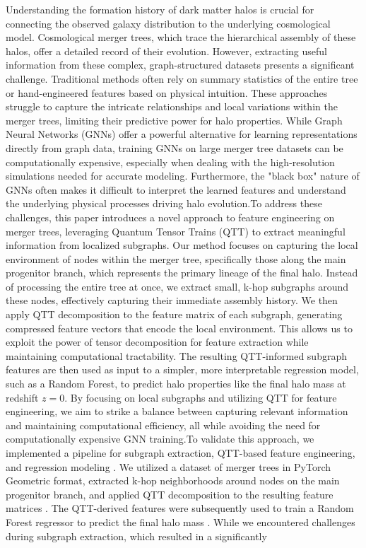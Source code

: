 \documentclass[twocolumn]{aastex631}
\begin{document}
Understanding the formation history of dark matter halos is crucial for connecting the observed galaxy distribution to the underlying cosmological model. Cosmological merger trees, which trace the hierarchical assembly of these halos, offer a detailed record of their evolution. However, extracting useful information from these complex, graph-structured datasets presents a significant challenge. Traditional methods often rely on summary statistics of the entire tree or hand-engineered features based on physical intuition. These approaches struggle to capture the intricate relationships and local variations within the merger trees, limiting their predictive power for halo properties. While Graph Neural Networks (GNNs) offer a powerful alternative for learning representations directly from graph data, training GNNs on large merger tree datasets can be computationally expensive, especially when dealing with the high-resolution simulations needed for accurate modeling. Furthermore, the "black box" nature of GNNs often makes it difficult to interpret the learned features and understand the underlying physical processes driving halo evolution.To address these challenges, this paper introduces a novel approach to feature engineering on merger trees, leveraging Quantum Tensor Trains (QTT) to extract meaningful information from localized subgraphs. Our method focuses on capturing the local environment of nodes within the merger tree, specifically those along the main progenitor branch, which represents the primary lineage of the final halo. Instead of processing the entire tree at once, we extract small, k-hop subgraphs around these nodes, effectively capturing their immediate assembly history. We then apply QTT decomposition to the feature matrix of each subgraph, generating compressed feature vectors that encode the local environment. This allows us to exploit the power of tensor decomposition for feature extraction while maintaining computational tractability. The resulting QTT-informed subgraph features are then used as input to a simpler, more interpretable regression model, such as a Random Forest, to predict halo properties like the final halo mass at redshift \(z=0\). By focusing on local subgraphs and utilizing QTT for feature engineering, we aim to strike a balance between capturing relevant information and maintaining computational efficiency, all while avoiding the need for computationally expensive GNN training.To validate this approach, we implemented a pipeline for subgraph extraction, QTT-based feature engineering, and regression modeling \citep{jespersen2022textttmangrovelearninggalaxyproperties,jung2024mergertreebasedgalaxymatching}. We utilized a dataset of merger trees in PyTorch Geometric format, extracted k-hop neighborhoods around nodes on the main progenitor branch, and applied QTT decomposition to the resulting feature matrices \citep{jespersen2022textttmangrovelearninggalaxyproperties,jung2024mergertreebasedgalaxymatching}. The QTT-derived features were subsequently used to train a Random Forest regressor to predict the final halo mass \citep{robles2022deeplearningapproachhalo,jespersen2022textttmangrovelearninggalaxyproperties,jung2024mergertreebasedgalaxymatching}. While we encountered challenges during subgraph extraction, which resulted in a significantly 
\end{document}
